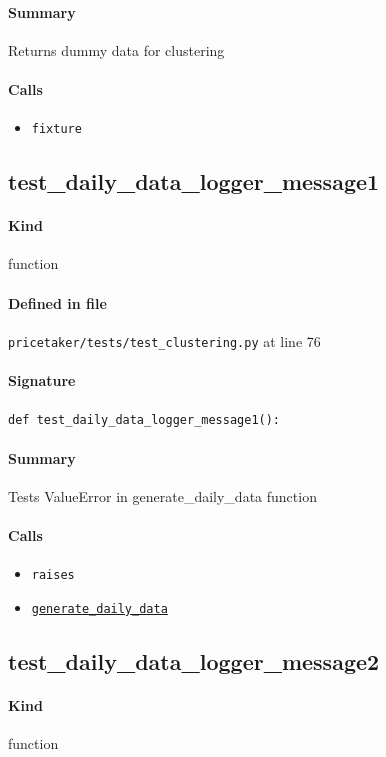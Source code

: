 \documentclass[11pt]{report}
\begin{document}
\paragraph{Summary} Returns dummy data for clustering
\paragraph{Calls}
\begin{itemize}[leftmargin=*]
  \item \texttt{fixture}
\end{itemize}
\subsection{test\_daily\_data\_logger\_message1}
\label{def:pricetaker-tests-test_clustering.py:test_daily_data_logger_message1:L76}
\paragraph{Kind} function
\paragraph{Defined in file} \texttt{pricetaker/tests/test\_clustering.py} at line 76
\paragraph{Signature} \texttt{def test\_daily\_data\_logger\_message1():}
\paragraph{Summary} Tests ValueError in generate\_daily\_data function
\paragraph{Calls}
\begin{itemize}[leftmargin=*]
  \item \texttt{raises}
  \item \hyperref[def:pricetaker-clustering.py:generate_daily_data:L35]{\texttt{generate\_daily\_data}}
\end{itemize}
\subsection{test\_daily\_data\_logger\_message2}
\label{def:pricetaker-tests-test_clustering.py:test_daily_data_logger_message2:L86}
\paragraph{Kind} function
\end{document}
